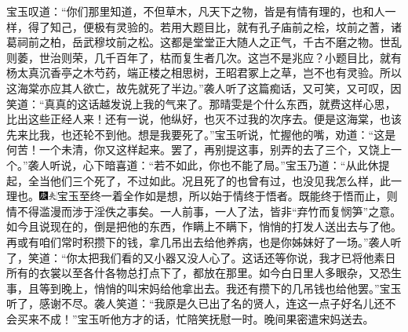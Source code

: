 宝玉叹道：“你们那里知道，不但草木，凡天下之物，皆是有情有理的，也和人一样，得了知己，便极有灵验的。若用大题目比，就有孔子庙前之桧，坟前之蓍，诸葛祠前之柏，岳武穆坟前之松。这都是堂堂正大随人之正气，千古不磨之物。世乱则萎，世治则荣，几千百年了，枯而复生者几次。这岂不是兆应？小题目比，就有杨太真沉香亭之木芍药，端正楼之相思树，王昭君冢上之草，岂不也有灵验。所以这海棠亦应其人欲亡，故先就死了半边。”袭人听了这篇痴话，又可笑，又可叹，因笑道：“真真的这话越发说上我的气来了。那晴雯是个什么东西，就费这样心思，比出这些正经人来！还有一说，他纵好，也灭不过我的次序去。便是这海棠，也该先来比我，也还轮不到他。想是我要死了。”宝玉听说，忙握他的嘴，劝道：“这是何苦！一个未清，你又这样起来。罢了，再别提这事，别弄的去了三个，又饶上一个。”袭人听说，心下暗喜道：“若不如此，你也不能了局。”宝玉乃道：“从此休提起，全当他们三个死了，不过如此。况且死了的也曾有过，也没见我怎么样，此一理也。{\includegraphics[width=3mm]{../Images/00004}\includegraphics[width=3mm]{../Images/00012}\footnotesize \kaishu 宝玉至终一着全作如是想，所以始于情终于悟者。既能终于悟而止，则情不得滥漫而涉于淫佚之事矣。一人前事，一人了法，皆非“弃竹而复悯笋”之意。}如今且说现在的，倒是把他的东西，作瞒上不瞒下，悄悄的打发人送出去与了他。再或有咱们常时积攒下的钱，拿几吊出去给他养病，也是你姊妹好了一场。”袭人听了，笑道：“你太把我们看的又小器又没人心了。这话还等你说，我才已将他素日所有的衣裳以至各什各物总打点下了，都放在那里。如今白日里人多眼杂，又恐生事，且等到晚上，悄悄的叫宋妈给他拿出去。我还有攒下的几吊钱也给他罢。”宝玉听了，感谢不尽。袭人笑道：“我原是久已出了名的贤人，连这一点子好名儿还不会买来不成！”宝玉听他方才的话，忙陪笑抚慰一时。晚间果密遣宋妈送去。

